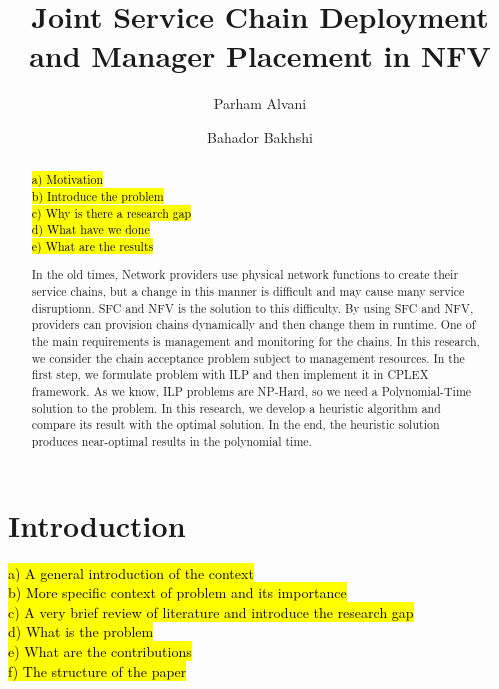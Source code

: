 \documentclass[preprint,review,12pt]{elsarticle}
\newcommand{\hly}[2][yellow]{
  {\sethlcolor{#1} \hl{#2}}
}
\begin{document}
\begin{frontmatter}

\title{Joint Service Chain Deployment and Manager Placement in NFV}

\author[aut]{Parham Alvani
}
\author[aut]{Bahador Bakhshi
}


\address[aut]{Amirkabir University of Technology, Tehran, Iran}

\begin{abstract}
\hly{%
a) Motivation \\
b) Introduce the problem \\
c) Why is there a research gap \\
d) What have we done \\
e) What are the results \\
}

In the old times, Network providers use physical network functions to create their service chains, but a change in this manner is difficult and may cause many service disruptionn.
SFC and NFV is the solution to this difficulty. By using SFC and NFV, providers can provision chains dynamically and then change them in runtime.
One of the main requirements is management and monitoring for the chains.
In this research, we consider the chain acceptance problem subject to management resources. In the first step, we formulate
problem with ILP and then implement it in CPLEX framework. As we know, ILP problems are NP-Hard, so we need a Polynomial-Time solution to the problem.
In this research, we develop a heuristic algorithm and compare its result with the optimal solution. In the end, the heuristic solution produces near-optimal results in the polynomial time.
\end{abstract}

\begin{keyword}
\end{keyword}

\end{frontmatter}

\section{Introduction}


\hly{%
a) A general introduction of the context \\
b) More specific context of problem and its importance \\
c) A very brief review of literature and introduce the research gap \\
d) What is the problem \\
e) What are the contributions \\
f) The structure of the paper \\
}
\end{document}
